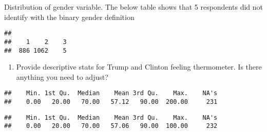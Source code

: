 \documentclass[]{article}
\newenvironment{Shaded}{\begin{snugshade}}{\end{snugshade}}
\newcommand{\KeywordTok}[1]{\textcolor[rgb]{0.13,0.29,0.53}{\textbf{#1}}}
\newcommand{\DecValTok}[1]{\textcolor[rgb]{0.00,0.00,0.81}{#1}}
\newcommand{\StringTok}[1]{\textcolor[rgb]{0.31,0.60,0.02}{#1}}
\newcommand{\CommentTok}[1]{\textcolor[rgb]{0.56,0.35,0.01}{\textit{#1}}}
\newcommand{\OtherTok}[1]{\textcolor[rgb]{0.56,0.35,0.01}{#1}}
\newcommand{\OperatorTok}[1]{\textcolor[rgb]{0.81,0.36,0.00}{\textbf{#1}}}
\newcommand{\NormalTok}[1]{#1}
\providecommand{\tightlist}{%
  \setlength{\itemsep}{0pt}\setlength{\parskip}{0pt}}
\begin{document}
Distribution of gender variable. The below table shows that 5
respondents did not identify with the binary gender definition

\begin{Shaded}
\end{Shaded}

\begin{verbatim}
## 
##    1    2    3 
##  886 1062    5
\end{verbatim}

\begin{enumerate}
\def\labelenumi{\arabic{enumi})}
\setcounter{enumi}{4}
\tightlist
\item
  Provide descriptive stats for Trump and Clinton feeling thermometer.
  Is there anything you need to adjust?
\end{enumerate}

\begin{Shaded}
\end{Shaded}

\begin{verbatim}
##    Min. 1st Qu.  Median    Mean 3rd Qu.    Max.    NA's 
##    0.00   20.00   70.00   57.12   90.00  200.00     231
\end{verbatim}

\begin{Shaded}
\end{Shaded}

\begin{verbatim}
##    Min. 1st Qu.  Median    Mean 3rd Qu.    Max.    NA's 
##    0.00   20.00   70.00   57.06   90.00  100.00     232
\end{verbatim}
\end{document}
